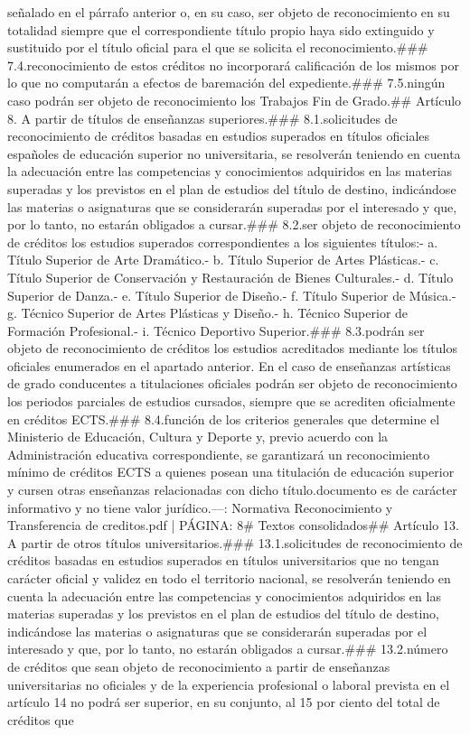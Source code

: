 \documentclass{article}
\begin{document}
\begin{itemize}
{{{{señalado en el párrafo anterior o, en su caso, ser objeto de reconocimiento en su totalidad siempre que el correspondiente título propio haya sido extinguido y sustituido por el título oficial para el que se solicita el reconocimiento.\n\n### 7.4.\nEl reconocimiento de estos créditos no incorporará calificación de los mismos por lo que no computarán a efectos de baremación del expediente.\n\n### 7.5.\nEn ningún caso podrán ser objeto de reconocimiento los Trabajos Fin de Grado.\n\n## Artículo 8. A partir de títulos de enseñanzas superiores.\n\n### 8.1.\nLas solicitudes de reconocimiento de créditos basadas en estudios superados en títulos oficiales españoles de educación superior no universitaria, se resolverán teniendo en cuenta la adecuación entre las competencias y conocimientos adquiridos en las materias superadas y los previstos en el plan de estudios del título de destino, indicándose las materias o asignaturas que se considerarán superadas por el interesado y que, por lo tanto, no estarán obligados a cursar.\n\n### 8.2. ser objeto de reconocimiento de créditos los estudios superados correspondientes a los siguientes títulos:\n- a. Título Superior de Arte Dramático.\n- b. Título Superior de Artes Plásticas.\n- c. Título Superior de Conservación y Restauración de Bienes Culturales.\n- d. Título Superior de Danza.\n- e. Título Superior de Diseño.\n- f. Título Superior de Música.\n- g. Técnico Superior de Artes Plásticas y Diseño.\n- h. Técnico Superior de Formación Profesional.\n- i. Técnico Deportivo Superior.\n\n### 8.3. podrán ser objeto de reconocimiento de créditos los estudios acreditados mediante los títulos oficiales enumerados en el apartado anterior. En el caso de enseñanzas artísticas de grado conducentes a titulaciones oficiales podrán ser objeto de reconocimiento los periodos parciales de estudios cursados, siempre que se acrediten oficialmente en créditos ECTS.\n\n### 8.4.\nEn función de los criterios generales que determine el Ministerio de Educación, Cultura y Deporte y, previo acuerdo con la Administración educativa correspondiente, se garantizará un reconocimiento mínimo de créditos ECTS a quienes posean una titulación de educación superior y cursen otras enseñanzas relacionadas con dicho título.\n\nEste documento es de carácter informativo y no tiene valor jurídico.\n\n---\n\nFUENTE: Normativa Reconocimiento y Transferencia de creditos.pdf | PÁGINA: 8\n# Textos consolidados\n\n## Artículo 13. A partir de otros títulos universitarios.\n\n### 13.1.\nLas solicitudes de reconocimiento de créditos basadas en estudios superados en títulos universitarios que no tengan carácter oficial y validez en todo el territorio nacional, se resolverán teniendo en cuenta la adecuación entre las competencias y conocimientos adquiridos en las materias superadas y los previstos en el plan de estudios del título de destino, indicándose las materias o asignaturas que se considerarán superadas por el interesado y que, por lo tanto, no estarán obligados a cursar.\n\n### 13.2.\nEl número de créditos que sean objeto de reconocimiento a partir de enseñanzas universitarias no oficiales y de la experiencia profesional o laboral prevista en el artículo 14 no podrá ser superior, en su conjunto, al 15 por ciento del total de créditos que }}}}
\end{itemize}
\end{document}
